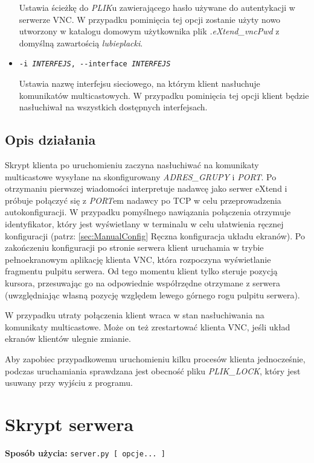 \begin{itemize}
      Ustawia ścieżkę do \emph{PLIK}u zawierającego hasło używane do autentykacji w serwerze VNC. W przypadku pominięcia tej opcji zostanie użyty nowo utworzony w katalogu domowym użytkownika plik \emph{.eXtend\_vncPwd} z domyślną zawartością \emph{lubieplacki}.

    \item \texttt{-i \emph{INTERFEJS}, -{}-interface \emph{INTERFEJS}}

      Ustawia nazwę interfejsu sieciowego, na którym klient nasłuchuje komunikatów multicastowych. W przypadku pominięcia tej opcji klient będzie nasłuchiwał na wszystkich dostępnych interfejsach.

  \end{itemize}

  \subsection{Opis działania}
    Skrypt klienta po uruchomieniu zaczyna nasłuchiwać na komunikaty multicastowe wysyłane na skonfigurowany \emph{ADRES\_GRUPY} i \emph{PORT}. Po otrzymaniu pierwszej wiadomości interpretuje nadawcę jako serwer eXtend i próbuje połączyć się z \emph{PORT}em nadawcy po TCP w celu przeprowadzenia autokonfiguracji. W przypadku pomyślnego nawiązania połączenia otrzymuje identyfikator, który jest wyświetlany w terminalu w celu ułatwienia ręcznej konfiguracji (patrz: \ref{sec:ManualConfig} Ręczna konfiguracja układu ekranów). Po zakończeniu konfiguracji po stronie serwera klient uruchamia w trybie pełnoekranowym aplikację klienta VNC, która rozpoczyna wyświetlanie fragmentu pulpitu serwera. Od tego momentu klient tylko steruje pozycją kursora, przesuwając go na odpowiednie współrzędne otrzymane z serwera (uwzględniając własną pozycję względem lewego górnego rogu pulpitu serwera).

    W przypadku utraty połączenia klient wraca w stan nasłuchiwania na komunikaty multicastowe. Może on też zrestartować klienta VNC, jeśli układ ekranów klientów ulegnie zmianie.

    Aby zapobiec przypadkowemu uruchomieniu kilku procesów klienta jednocześnie, podczas uruchamiania sprawdzana jest obecność pliku \emph{PLIK\_LOCK}, który jest usuwany przy wyjściu z programu.


\section{Skrypt serwera}

  \textbf{Sposób użycia:}
  \texttt{server.py [ opcje... ]}

